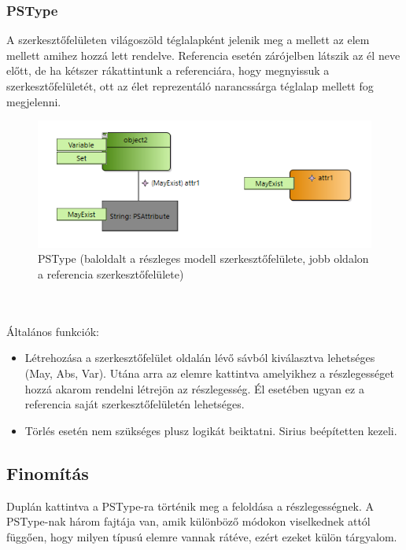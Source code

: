 \subsubsection{PSType}
A szerkesztőfelületen világoszöld téglalapként jelenik meg a mellett az elem mellett amihez hozzá lett rendelve. Referencia esetén zárójelben látszik az él neve előtt, de ha kétszer rákattintunk a referenciára, hogy megnyissuk a szerkesztőfelületét, ott az élet reprezentáló narancssárga téglalap mellett fog megjelenni.
\begin{figure}[!ht]
	\centering
	\includegraphics{figures/part.png}
	\caption{PSType (baloldalt a részleges modell szerkesztőfelülete, jobb oldalon a referencia szerkesztőfelülete)}
	\label{part} 
\end{figure}
\\\\
Általános funkciók:
\begin{itemize}  	
	\item Létrehozása a szerkesztőfelület oldalán lévő sávból kiválasztva lehetséges (May, Abs, Var). Utána arra az elemre kattintva amelyikhez a részlegességet hozzá akarom rendelni létrejön az részlegesség. Él esetében ugyan ez a referencia saját szerkesztőfelületén lehetséges.
	
	\item Törlés esetén nem szükséges plusz logikát beiktatni. Sirius  beépítetten kezeli.	
\end{itemize}

\subsection{Finomítás}
Duplán kattintva a PSType-ra történik meg a feloldása a részlegességnek. A PSType-nak három fajtája van, amik különböző módokon viselkednek attól függően, hogy milyen típusú elemre vannak rátéve, ezért ezeket külön tárgyalom. 

